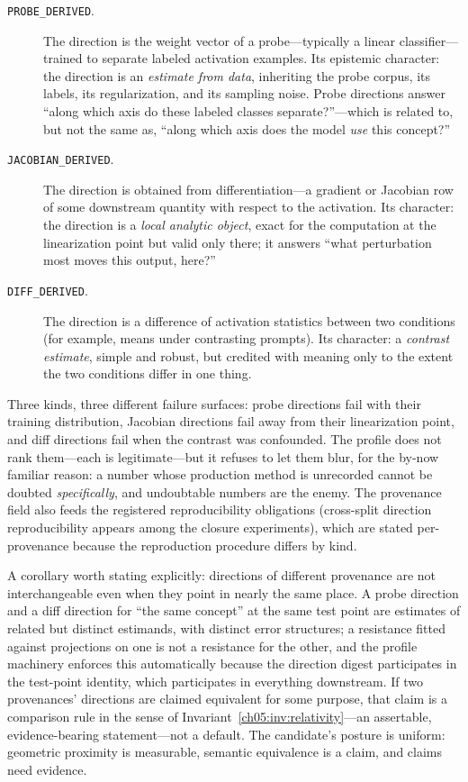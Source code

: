 \begin{description}
\item[\texttt{PROBE\_DERIVED}.] The direction is the weight vector of a
probe---typically a linear classifier---trained to separate labeled
activation examples. Its epistemic character: the direction is an
\emph{estimate from data}, inheriting the probe corpus, its labels, its
regularization, and its sampling noise. Probe directions answer ``along
which axis do these labeled classes separate?''---which is related to, but
not the same as, ``along which axis does the model \emph{use} this
concept?''
\item[\texttt{JACOBIAN\_DERIVED}.] The direction is obtained from
differentiation---a gradient or Jacobian row of some downstream quantity
with respect to the activation. Its character: the direction is a
\emph{local analytic object}, exact for the computation at the linearization
point but valid only there; it answers ``what perturbation most moves this
output, here?''
\item[\texttt{DIFF\_DERIVED}.] The direction is a difference of activation
statistics between two conditions (for example, means under contrasting
prompts). Its character: a \emph{contrast estimate}, simple and robust, but
credited with meaning only to the extent the two conditions differ in one
thing.
\end{description}

Three kinds, three different failure surfaces: probe directions fail with
their training distribution, Jacobian directions fail away from their
linearization point, and diff directions fail when the contrast was
confounded. The profile does not rank them---each is legitimate---but it
refuses to let them blur, for the by-now familiar reason: a number whose
production method is unrecorded cannot be doubted \emph{specifically}, and
undoubtable numbers are the enemy. The provenance field also feeds the
registered reproducibility obligations (cross-split direction
reproducibility appears among the closure experiments), which are stated
per-provenance because the reproduction procedure differs by kind.

A corollary worth stating explicitly: directions of different provenance are
not interchangeable even when they point in nearly the same place. A probe
direction and a diff direction for ``the same concept'' at the same test
point are estimates of related but distinct estimands, with distinct error
structures; a resistance fitted against projections on one is not a
resistance for the other, and the profile machinery enforces this
automatically because the direction digest participates in the test-point
identity, which participates in everything downstream. If two provenances'
directions are claimed equivalent for some purpose, that claim is a
comparison rule in the sense of Invariant~\ref{ch05:inv:relativity}---an
assertable, evidence-bearing statement---not a default. The candidate's
posture is uniform: geometric proximity is measurable, semantic
equivalence is a claim, and claims need evidence.


